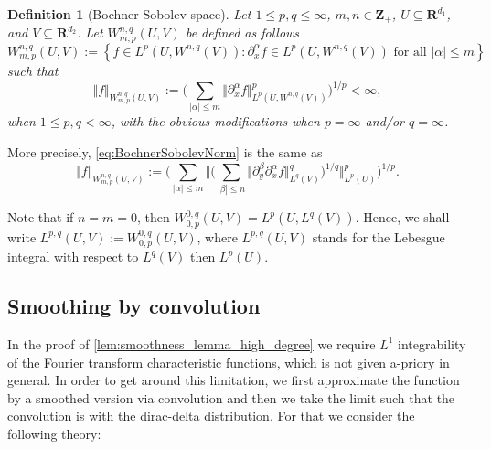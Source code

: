 \documentclass[a4paper]{article}
\newcommand{\rr}[1]{\mathbf{R}^{#1}}
\newcommand{\zzp}[1]{\mathbf{Z}_+^{#1}}
\numberwithin{equation}{section}
\newtheorem{definition}[theorem]{Definition}
\theoremstyle{remark}
\begin{document}
\begin{definition}[Bochner-Sobolev space]
Let $1 \leq p,q \leq \infty$, $m, n\in \zzp{}$,
$U \subseteq \rr{d_1}$,
and  $V\subseteq \rr{d_2}$. Let
$W_{m,p}^{n, q}(U, V)$
be defined as follows 
$$
W_{m,p}^{n, q}(U, V)
:=\left\{f \in L^{p}
\left(U, W^{n, q}(V)\right):
\partial _x^ \alpha f \in L^{p}\left(U, W^{n, q}(V)\right)
 \text { for all }  |\alpha| \leq m\right\}
$$
such that
\begin{equation}\label{eq:BochnerSobolevNorm}
    \Vert f\Vert _{W_{m,p}^{n, q}(U, V)}
    :=
    \bigg(\sum_{|\alpha| \leq m}
    \Vert \partial _x^ \alpha  f\Vert_{L^{p}\left(U, W^{n, q}(V)\right)}^p\bigg)^{1/p}
        <\infty,
\end{equation}
when $1\leq p, q< \infty$,
with the obvious modifications when $p=\infty$ and/or $q=\infty$.
\end{definition}
More precisely, \eqref{eq:BochnerSobolevNorm} is the same as
\begin{equation}\label{eq:BochnerSobolevNorm_as_Lebesgue}
    \Vert f\Vert _{W_{m,p}^{n, q}(U, V)}
    :=
    \bigg(\sum_{|\alpha| \leq m}
    \bigg\Vert \bigg(\sum_{|\beta| \leq n}
    \Vert \partial_y^\beta \partial_x^\alpha f
    \Vert_{L^{q}\left(V\right)}^q\bigg)^{1/q}
    \bigg\Vert_{L^{p}\left(U\right)}^p \bigg)^{1/p}.
\end{equation}

Note that if $n=m=0$, then
$W_{0,p}^{0,q}(U, V) = L^p(U, L^q(V))$.
Hence, we shall write
$L^{p,q}(U, V) := W_{0,p}^{0,q}(U, V)$,
where $L^{p,q}(U, V)$
stands for the Lebesgue integral with respect to 
$L^q(V)$ then $L^{p}(U)$.


\subsection{Smoothing by convolution}\label{sec:SmoothConv}

In the proof of \cref{lem:smoothness_lemma_high_degree}
we require $L^1$ integrability of the
Fourier transform characteristic functions,
which is not given a-priory in general.
In order to get around this limitation,
we first approximate the function 
by a smoothed version via convolution
and then we take the limit such that
the convolution is with the dirac-delta distribution.
For that we consider the following theory:
\end{document}
